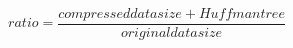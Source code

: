 \documentclass{article}
\begin{document}
\[ratio = \frac{compressed data size + Huffman tree}{original data size}\]
\pagebreak
\end{document}
